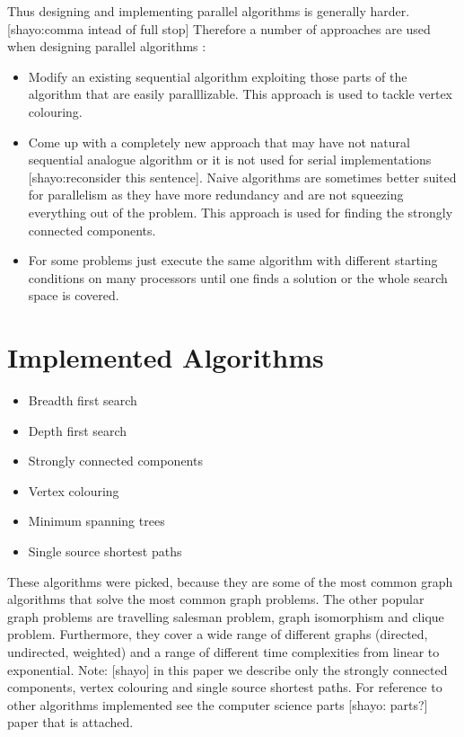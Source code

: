 \documentclass{report}
\theoremstyle{plain}
\theoremstyle{definition}
\theoremstyle{remark}
\numberwithin{definition}{chapter}
\numberwithin{example}{chapter}
\numberwithin{figure}{chapter}
\begin{document}
{{Thus designing and implementing parallel algorithms is generally harder. [shayo:comma intead of full stop] Therefore a number of approaches are used when designing parallel algorithms \cite{berman1996fundamentals}:
\begin{itemize}
  \item Modify an existing sequential algorithm exploiting those parts of the algorithm that are easily paralllizable. This approach is used to tackle vertex colouring.
  \item Come up with a completely new approach that may have not natural sequential analogue algorithm or it is not used for serial implementations [shayo:reconsider this sentence]. Naive algorithms are sometimes better suited for parallelism as they have more redundancy and are not squeezing everything out of the problem. This approach is used for finding the strongly connected components.
  \item For some problems just execute the same algorithm with different starting conditions on many processors until one finds a solution or the whole search space is covered.
\end{itemize}

\section{Implemented Algorithms}
\begin{itemize}
  \item Breadth first search
  \item Depth first search
  \item Strongly connected components
  \item Vertex colouring
  \item Minimum spanning trees
  \item Single source shortest paths
\end{itemize}

These algorithms were picked, because they are some of the most common graph algorithms that solve the most common graph problems. The other popular graph problems are travelling salesman problem, graph isomorphism and clique problem. Furthermore, they cover a wide range of different graphs (directed, undirected, weighted) and a range of different time complexities from linear to exponential. Note: [shayo] in this paper we describe only the strongly connected components, vertex colouring and single source shortest paths. For reference to other algorithms implemented see the computer science parts [shayo: parts?] paper that is attached.

}}
\end{document}
